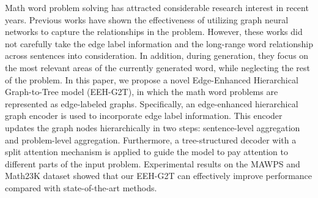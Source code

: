 Math word problem solving has attracted considerable research interest in recent years. Previous works have shown the effectiveness of utilizing graph neural networks to capture the relationships in the problem. However, these works did not carefully take the edge label information and the long-range word relationship across sentences into consideration. In addition, during generation, they focus on the most relevant areas of the currently generated word, while neglecting the rest of the problem. In this paper, we propose a novel Edge-Enhanced Hierarchical Graph-to-Tree model (EEH-G2T), in which the math word problems are represented as edge-labeled graphs. Specifically, an edge-enhanced hierarchical graph encoder is used to incorporate edge label information. This encoder updates the graph nodes hierarchically in two steps: sentence-level aggregation and problem-level aggregation. Furthermore, a tree-structured decoder with a split attention mechanism is applied to guide the model to pay attention to different parts of the input problem. Experimental results on the MAWPS and Math23K dataset showed that our EEH-G2T can effectively improve performance compared with state-of-the-art methods.
